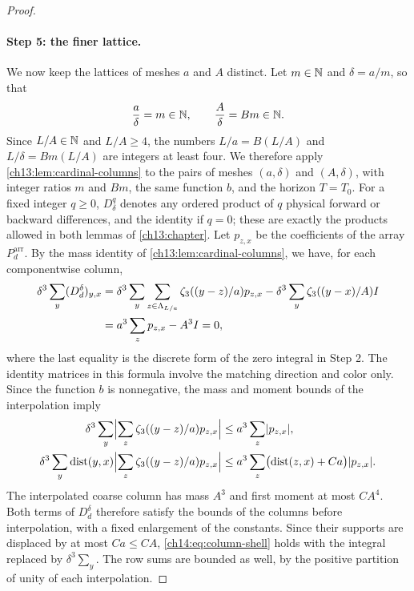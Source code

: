 \begin{proof}
\paragraph{Step 5: the finer lattice.}
We now keep the lattices of meshes $a$ and $A$ distinct. Let $m\in\mathbb N$ and $\delta=a/m$, so that
\begin{equation}\label{ch14:eq:refinement-ratios}
 \frac a\delta=m\in\mathbb N,\qquad\frac A\delta=Bm\in\mathbb N.
\end{equation}
Since $L/A\in\mathbb N$ and $L/A\ge4$, the numbers $L/a=B(L/A)$ and $L/\delta=Bm(L/A)$ are integers at least four. We therefore apply \cref{ch13:lem:cardinal-columns} to the pairs of meshes $(a,\delta)$ and $(A,\delta)$, with integer ratios $m$ and $Bm$, the same function $b$, and the horizon $T=T_0$. For a fixed integer $q\ge0$, $D_\delta^q$ denotes any ordered product of $q$ physical forward or backward differences, and the identity if $q=0$; these are exactly the products allowed in both lemmas of \cref{ch13:chapter}. Let $p_{z,x}$ be the coefficients of the array $P_d^{\mathrm{arr}}$. By the mass identity of \cref{ch13:lem:cardinal-columns}, we have, for each componentwise column,
\begin{equation}\label{ch14:eq:cardinal-signed-mass}
 \begin{split}
 \delta^3\sum_y(D_d^\delta)_{y,x}
 &=\delta^3\sum_y\sum_{z\in\Lambda_{L/a}}\zeta_3((y-z)/a)p_{z,x}-\delta^3\sum_y\zeta_3((y-x)/A)I\\
 &=a^3\sum_zp_{z,x}-A^3I=0,
 \end{split}
\end{equation}
where the last equality is the discrete form of the zero integral in Step 2. The identity matrices in this formula involve the matching direction and color only. Since the function $b$ is nonnegative, the mass and moment bounds of the interpolation imply
\[
 \begin{split}
 \delta^3\sum_y\Bigl\lvert\sum_z\zeta_3((y-z)/a)p_{z,x}\Bigr\rvert&\le a^3\sum_z\lvert p_{z,x}\rvert,\\
 \delta^3\sum_y\operatorname{dist}(y,x)\Bigl\lvert\sum_z\zeta_3((y-z)/a)p_{z,x}\Bigr\rvert&\le a^3\sum_z\bigl(\operatorname{dist}(z,x)+Ca\bigr)\lvert p_{z,x}\rvert.
 \end{split}
\]
The interpolated coarse column has mass $A^3$ and first moment at most $CA^4$. Both terms of $D_d^\delta$ therefore satisfy the bounds of the columns before interpolation, with a fixed enlargement of the constants. Since their supports are displaced by at most $Ca\le CA$, \eqref{ch14:eq:column-shell} holds with the integral replaced by $\delta^3\sum_y$. The row sums are bounded as well, by the positive partition of unity of each interpolation.


\end{proof}

